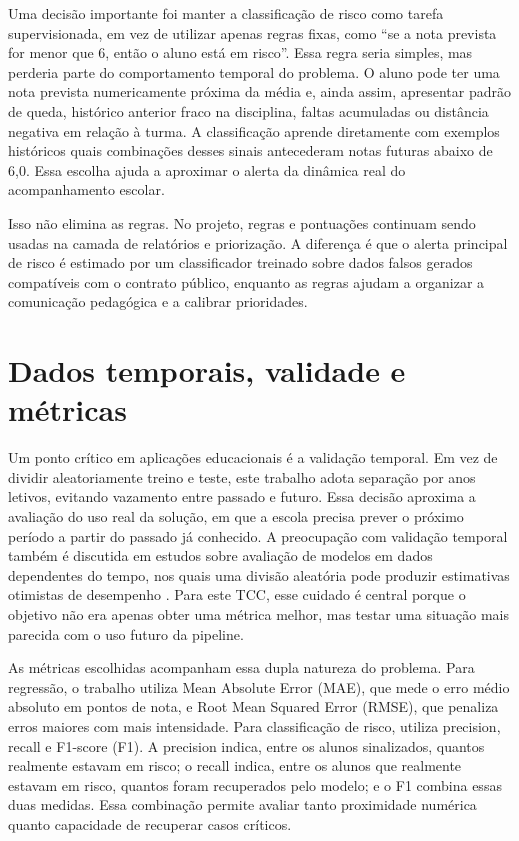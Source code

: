 Uma decis\~ao importante foi manter a classifica\c{c}\~ao de risco como tarefa supervisionada, em vez de utilizar apenas regras fixas, como ``se a nota prevista for menor que 6, ent\~ao o aluno est\'a em risco''. Essa regra seria simples, mas perderia parte do comportamento temporal do problema. O aluno pode ter uma nota prevista numericamente pr\'oxima da m\'edia e, ainda assim, apresentar padr\~ao de queda, hist\'orico anterior fraco na disciplina, faltas acumuladas ou dist\^ancia negativa em rela\c{c}\~ao \`a turma. A classifica\c{c}\~ao aprende diretamente com exemplos hist\'oricos quais combina\c{c}\~oes desses sinais antecederam notas futuras abaixo de 6,0. Essa escolha ajuda a aproximar o alerta da din\^amica real do acompanhamento escolar.

Isso n\~ao elimina as regras. No projeto, regras e pontua\c{c}\~oes continuam sendo usadas na camada de relat\'orios e prioriza\c{c}\~ao. A diferen\c{c}a \'e que o alerta principal de risco \'e estimado por um classificador treinado sobre dados falsos gerados compat\'iveis com o contrato p\'ublico, enquanto as regras ajudam a organizar a comunica\c{c}\~ao pedag\'ogica e a calibrar prioridades.

\section{Dados temporais, validade e m\'etricas}
\label{sec:dados-temporais-metricas}

Um ponto cr\'itico em aplica\c{c}\~oes educacionais \'e a valida\c{c}\~ao temporal. Em vez de dividir aleatoriamente treino e teste, este trabalho adota separa\c{c}\~ao por anos letivos, evitando vazamento entre passado e futuro. Essa decis\~ao aproxima a avalia\c{c}\~ao do uso real da solu\c{c}\~ao, em que a escola precisa prever o pr\'oximo per\'iodo a partir do passado j\'a conhecido. A preocupa\c{c}\~ao com valida\c{c}\~ao temporal tamb\'em \'e discutida em estudos sobre avalia\c{c}\~ao de modelos em dados dependentes do tempo, nos quais uma divis\~ao aleat\'oria pode produzir estimativas otimistas de desempenho \cite{bergmeir2018}. Para este TCC, esse cuidado \'e central porque o objetivo n\~ao era apenas obter uma m\'etrica melhor, mas testar uma situa\c{c}\~ao mais parecida com o uso futuro da pipeline.

As m\'etricas escolhidas acompanham essa dupla natureza do problema. Para regress\~ao, o trabalho utiliza Mean Absolute Error (MAE), que mede o erro m\'edio absoluto em pontos de nota, e Root Mean Squared Error (RMSE), que penaliza erros maiores com mais intensidade. Para classifica\c{c}\~ao de risco, utiliza precision, recall e F1-score (F1). A precision indica, entre os alunos sinalizados, quantos realmente estavam em risco; o recall indica, entre os alunos que realmente estavam em risco, quantos foram recuperados pelo modelo; e o F1 combina essas duas medidas. Essa combina\c{c}\~ao permite avaliar tanto proximidade num\'erica quanto capacidade de recuperar casos cr\'iticos.

